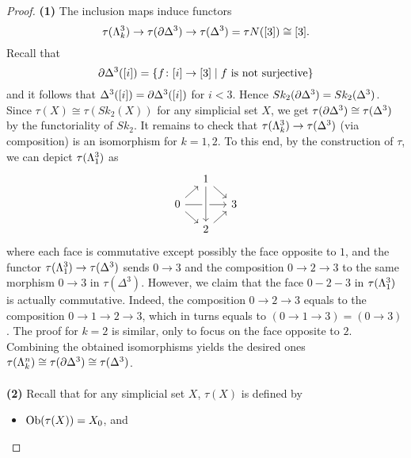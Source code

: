 \documentclass[a4paper,11pt,openany]{scrartcl}
\begin{document}
\begin{proof}
\textbf{(1)} The inclusion maps induce functors 
\[
\tau(\Lambda^3_k)\to\tau(\partial\Delta^3)\to\tau(\Delta^3)=\tau N([3])\cong[3].
\]
Recall that 
\[
\partial\Delta^3([i])=\{f\colon[i]\to[3]\mid\text{$f$ is not surjective}\}
\]
and it follows that $\Delta^3([i])=\partial\Delta^3([i])$ for $i<3$. Hence $Sk_2(\partial\Delta^3)=Sk_2(\Delta^3)$. Since $\tau(X)\cong\tau(Sk_2(X))$ for any simplicial set $X$, we get $\tau(\partial\Delta^3)\cong\tau(\Delta^3)$ by the functoriality of $Sk_2$. It remains to check that $\tau(\Lambda^3_k)\to\tau(\Delta^3)$ (via composition) is an isomorphism for $k=1,2$. To this end, by the construction of $\tau$, we can depict $\tau(\Lambda^3_1)$ as
\[
\begin{tikzcd}[sep=small]
& 1\arrow[dr]&\\
0\arrow[ur]\arrow[dr]\arrow[rr]&& 3\\
& 2\arrow[ur]\arrow[from=uu,crossing over]&
\end{tikzcd}
\]
where each face is commutative except possibly the face opposite to $1$, and the functor $\tau(\Lambda^3_1)\to\tau(\Delta^3)$ sends $0\to 3$ and the composition $0\to 2\to 3$ to the same morphism $0\to 3$ in $\tau(\Delta^3)$. However, we claim that the face $0-2-3$ in $\tau(\Lambda^3_1)$ is actually commutative. Indeed, the composition $0\to 2\to 3$ equals to the composition $0\to 1\to 2\to 3$, which in turns equals to $(0\to 1\to 3)=(0\to 3)$. The proof for $k=2$ is similar, only to focus on the face opposite to $2$. Combining the obtained isomorphisms yields the desired ones $\tau(\Lambda^n_k)\cong\tau(\partial\Delta^3)\cong\tau(\Delta^3)$.\\
\\
\textbf{(2)} Recall that for any simplicial set $X$, $\tau(X)$ is defined by 
\begin{itemize}
\item $\operatorname{Ob}(\tau(X))=X_0$, and


\end{itemize}
\end{proof}
\end{document}
